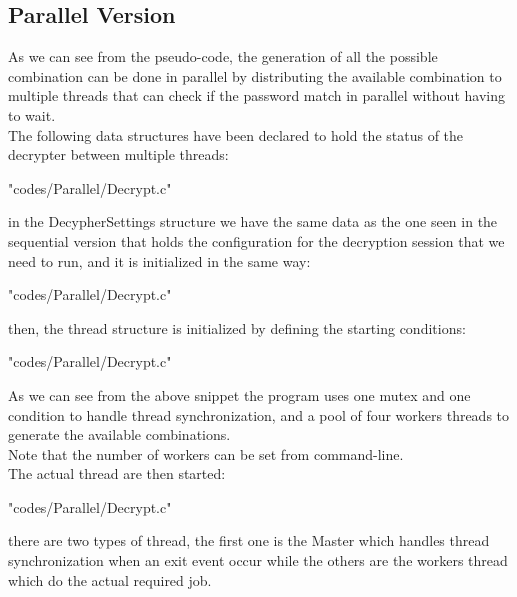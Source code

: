 \documentclass[10pt,twocolumn,letterpaper]{article}
\begin{document}
\subsection{Parallel Version}
As we can see from the pseudo-code, the generation of all the possible combination can be done in parallel by distributing the available
combination to multiple threads that can check if the password match in parallel without having to wait.\\
The following data structures have been declared to hold the status of the decrypter between multiple threads:\\
\begin{lstinputlisting}[language=C,style=CSnippetStyle,caption=Parallel Data Structure,firstline=1,lastline=33]{
	"codes/Parallel/Decrypt.c"}
\end{lstinputlisting}
in the DecypherSettings structure we have the same data as the one seen in the sequential version that holds the configuration for the 
decryption session that we need to run, and it is initialized in the same way:
\begin{lstinputlisting}[language=C,style=CSnippetStyle,caption=Decrypter Session Data Structure 
	Initialization,firstline=212,lastline=223]{"codes/Parallel/Decrypt.c"}
\end{lstinputlisting}
then, the thread structure is initialized by defining the starting conditions:\\
\begin{lstinputlisting}[language=C,style=CSnippetStyle,caption=Parallel Data Structure 
			Initialization,firstline=225,lastline=236]{"codes/Parallel/Decrypt.c"}
\end{lstinputlisting}
As we can see from the above snippet the program uses one mutex and one condition to handle thread synchronization, and a pool of four
workers threads to generate the available combinations.\\
Note that the number of workers can be set from command-line.\\
The actual thread are then started:\\
\begin{lstinputlisting}[language=C,style=CSnippetStyle,caption=Thread Launch,firstline=238,lastline=241]{"codes/Parallel/Decrypt.c"}
\end{lstinputlisting}
there are two types of thread, the first one is the Master which handles thread synchronization when an exit event occur while the 
others are the workers thread which do the actual required job.\\
\end{document}
